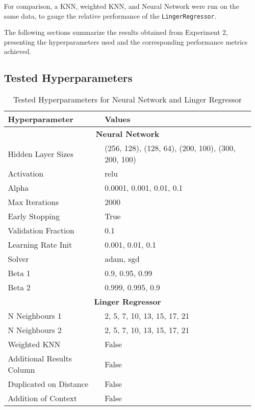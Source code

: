 \documentclass[a4paper, 12pt]{report}
\begin{document}
For comparison, a KNN, weighted KNN, and Neural Network were run on the same data, 
to gauge the relative performance of the \texttt{LingerRegressor}.

The following sections summarize the results obtained from Experiment 2, presenting the hyperparameters used and the corresponding performance metrics achieved.

\subsection{Tested Hyperparameters}

\begin{table}[H]
    \centering
    \caption{Tested Hyperparameters for Neural Network and Linger Regressor}
    \label{tab:hyperparameters_abalone}
    \begin{tabular}{|l|l|}
    \hline
    \textbf{Hyperparameter} & \textbf{Values} \\ \hline
    \multicolumn{2}{|c|}{\textbf{Neural Network}} \\ \hline
    Hidden Layer Sizes & (256, 128), (128, 64), (200, 100), (300, 200, 100) \\ \hline
    Activation & relu \\ \hline
    Alpha & 0.0001, 0.001, 0.01, 0.1 \\ \hline
    Max Iterations & 2000 \\ \hline
    Early Stopping & True \\ \hline
    Validation Fraction & 0.1 \\ \hline
    Learning Rate Init & 0.001, 0.01, 0.1 \\ \hline
    Solver & adam, sgd \\ \hline
    Beta 1 & 0.9, 0.95, 0.99 \\ \hline
    Beta 2 & 0.999, 0.995, 0.9 \\ \hline
    \multicolumn{2}{|c|}{\textbf{Linger Regressor}} \\ \hline
    N Neighbours 1 & 2, 5, 7, 10, 13, 15, 17, 21 \\ \hline
    N Neighbours 2 & 2, 5, 7, 10, 13, 15, 17, 21 \\ \hline
    Weighted KNN & False \\ \hline
    Additional Results Column & False \\ \hline
    Duplicated on Distance & False \\ \hline
    Addition of Context & False \\ \hline
    \end{tabular}
\end{table}
\end{document}
